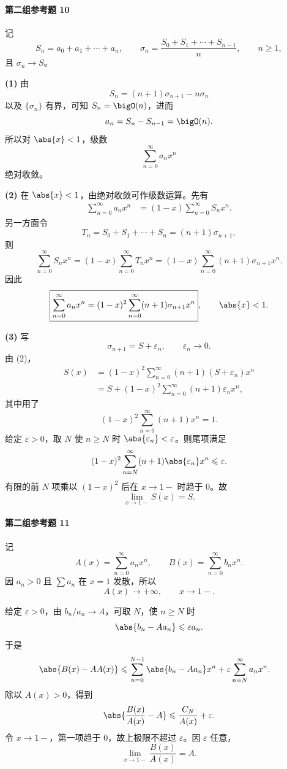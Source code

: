 \paragraph{第二组参考题 10}
\begin{xsolution}
记
\[
  S_n=a_0+a_1+\cdots+a_n,
  \qquad
  \sigma_n=\frac{S_0+S_1+\cdots+S_{n-1}}n,
  \qquad n\geqslant1,
\]
且 $\sigma_n\to S$。

\textbf{(1)} 由
\[
  S_n=(n+1)\sigma_{n+1}-n\sigma_n
\]
以及 $\{\sigma_n\}$ 有界，可知 $S_n=\bigO(n)$，进而
\[
  a_n=S_n-S_{n-1}=\bigO(n).
\]
所以对 $\abs{x}<1$，级数
\[
  \sum_{n=0}^{\infty}a_nx^n
\]
绝对收敛。

\textbf{(2)} 在 $\abs{x}<1$，由绝对收敛可作级数运算。先有
\[
\begin{aligned}
  \sum_{n=0}^{\infty}a_nx^n
  &=(1-x)\sum_{n=0}^{\infty}S_nx^n.
\end{aligned}
\]
另一方面令
\[
  T_n=S_0+S_1+\cdots+S_n=(n+1)\sigma_{n+1},
\]
则
\[
  \sum_{n=0}^{\infty}S_nx^n
  =(1-x)\sum_{n=0}^{\infty}T_nx^n
  =(1-x)\sum_{n=0}^{\infty}(n+1)\sigma_{n+1}x^n.
\]
因此
\[
  \boxed{
  \sum_{n=0}^{\infty}a_nx^n
  =(1-x)^2\sum_{n=0}^{\infty}(n+1)\sigma_{n+1}x^n},
  \qquad \abs{x}<1.
\]

\textbf{(3)} 写
\[
  \sigma_{n+1}=S+\varepsilon_n,
  \qquad \varepsilon_n\to0.
\]
由 (2)，
\[
\begin{aligned}
  S(x)
  &=(1-x)^2\sum_{n=0}^{\infty}(n+1)(S+\varepsilon_n)x^n\\
  &=S+(1-x)^2\sum_{n=0}^{\infty}(n+1)\varepsilon_nx^n,
\end{aligned}
\]
其中用了
\[
  (1-x)^2\sum_{n=0}^{\infty}(n+1)x^n=1.
\]
给定 $\varepsilon>0$，取 $N$ 使 $n\geqslant N$ 时 $\abs{\varepsilon_n}<\varepsilon$。则尾项满足
\[
  (1-x)^2\sum_{n=N}^{\infty}(n+1)\abs{\varepsilon_n}x^n
  \leqslant\varepsilon.
\]
有限的前 $N$ 项乘以 $(1-x)^2$ 后在 $x\to1-$ 时趋于 $0$。故
\[
  \boxed{\lim_{x\to1-}S(x)=S}.
\]
\end{xsolution}

\paragraph{第二组参考题 11}
\begin{xsolution}
记
\[
  A(x)=\sum_{n=0}^{\infty}a_nx^n,
  \qquad
  B(x)=\sum_{n=0}^{\infty}b_nx^n.
\]
因 $a_n>0$ 且 $\sum a_n$ 在 $x=1$ 发散，所以
\[
  A(x)\to+\infty,
  \qquad x\to1-.
\]

给定 $\varepsilon>0$，由 $b_n/a_n\to A$，可取 $N$，使 $n\geqslant N$ 时
\[
  \abs{b_n-Aa_n}\leqslant\varepsilon a_n.
\]
于是
\[
\begin{aligned}
  \abs{B(x)-AA(x)}
  &\leqslant\sum_{n=0}^{N-1}\abs{b_n-Aa_n}x^n
  +\varepsilon\sum_{n=N}^{\infty}a_nx^n.
\end{aligned}
\]
除以 $A(x)>0$，得到
\[
  \abs{\frac{B(x)}{A(x)}-A}
  \leqslant\frac{C_N}{A(x)}+\varepsilon.
\]
令 $x\to1-$，第一项趋于 $0$，故上极限不超过 $\varepsilon$。因 $\varepsilon$ 任意，
\[
  \boxed{
  \lim_{x\to1-}\frac{B(x)}{A(x)}=A}.
\]
\end{xsolution}

